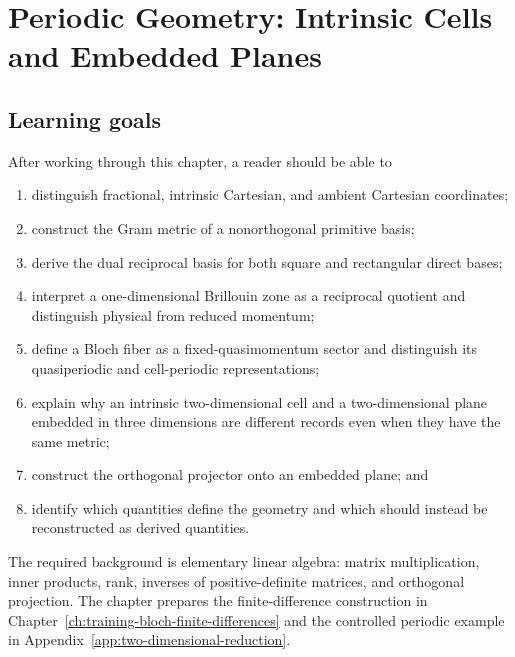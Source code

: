 \chapter{Periodic Geometry: Intrinsic Cells and Embedded Planes}

\label{ch:training-periodic-geometry}


\section{Learning goals}

After working through this chapter, a reader should be able to

\begin{enumerate}
  \item distinguish fractional, intrinsic Cartesian, and ambient Cartesian
        coordinates;
  \item construct the Gram metric of a nonorthogonal primitive basis;
  \item derive the dual reciprocal basis for both square and rectangular direct
        bases;
  \item interpret a one-dimensional Brillouin zone as a reciprocal quotient
        and distinguish physical from reduced momentum;
  \item define a Bloch fiber as a fixed-quasimomentum sector and distinguish
        its quasiperiodic and cell-periodic representations;
  \item explain why an intrinsic two-dimensional cell and a two-dimensional
        plane embedded in three dimensions are different records even when they
        have the same metric;
  \item construct the orthogonal projector onto an embedded plane; and
  \item identify which quantities define the geometry and which should instead
        be reconstructed as derived quantities.
\end{enumerate}

The required background is elementary linear algebra: matrix multiplication,
inner products, rank, inverses of positive-definite matrices, and orthogonal
projection. The chapter prepares the finite-difference construction in
Chapter~\ref{ch:training-bloch-finite-differences} and the controlled
periodic example in Appendix~\ref{app:two-dimensional-reduction}.

